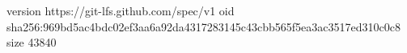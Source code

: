 version https://git-lfs.github.com/spec/v1
oid sha256:969bd5ac4bdc02ef3aa6a92da4317283145c43cbb565f5ea3ac3517ed310c0c8
size 43840
